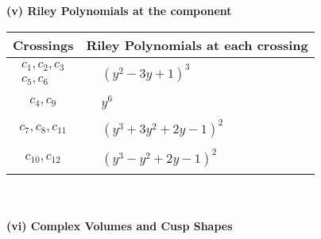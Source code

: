 \documentclass[1p]{elsarticle_modified}
\theoremstyle{definition}
\begin{document}
\newpage\renewcommand{\arraystretch}{1}
\flushleft \textbf{(v) Riley Polynomials at the component}\newline \\
\begin{tabular}{m{50pt}|m{274pt}}
Crossings & \hspace{64pt}Riley Polynomials at each crossing \\
\hline $$\begin{aligned}c_{1},c_{2},c_{3}\\c_{5},c_{6}\end{aligned}$$&$\begin{aligned}
&(y^2-3 y+1)^3
\end{aligned}$\\
\hline $$\begin{aligned}c_{4},c_{9}\end{aligned}$$&$\begin{aligned}
&y^6
\end{aligned}$\\
\hline $$\begin{aligned}c_{7},c_{8},c_{11}\end{aligned}$$&$\begin{aligned}
&(y^3+3 y^2+2 y-1)^2
\end{aligned}$\\
\hline $$\begin{aligned}c_{10},c_{12}\end{aligned}$$&$\begin{aligned}
&(y^3- y^2+2 y-1)^2
\end{aligned}$\\
\hline
\end{tabular}\\~\\
\newpage\flushleft \textbf{(vi) Complex Volumes and Cusp Shapes}
\end{document}
